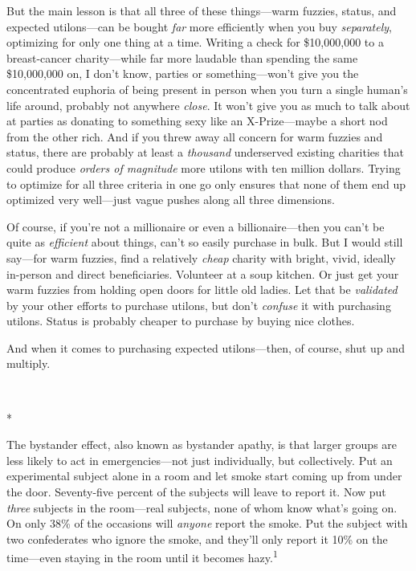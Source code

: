 {
 But the main lesson is that all three of these things---warm
fuzzies, status, and expected utilons---can be bought \textit{far} more
efficiently when you buy \textit{separately}, optimizing for only one
thing at a time. Writing a check for \$10,000,000 to a breast-cancer
charity---while far more laudable than spending the same \$10,000,000
on, I don't know, parties or
something---won't give you the concentrated euphoria of
being present in person when you turn a single human's
life around, probably not anywhere \textit{close}. It
won't give you as much to talk about at parties as
donating to something sexy like an X-Prize---maybe a short nod from the
other rich. And if you threw away all concern for warm fuzzies and
status, there are probably at least a \textit{thousand} underserved
existing charities that could produce \textit{orders of magnitude} more
utilons with ten million dollars. Trying to optimize for all three
criteria in one go only ensures that none of them end up optimized very
well---just vague pushes along all three dimensions.}

{
 Of course, if you're not a millionaire or even a
billionaire---then you can't be quite as
\textit{efficient} about things, can't so easily
purchase in bulk. But I would still say---for warm fuzzies, find a
relatively \textit{cheap} charity with bright, vivid, ideally in-person
and direct beneficiaries. Volunteer at a soup kitchen. Or just get your
warm fuzzies from holding open doors for little old ladies. Let that be
\textit{validated} by your other efforts to purchase utilons, but
don't \textit{confuse} it with purchasing utilons.
Status is probably cheaper to purchase by buying nice clothes.}

{
 And when it comes to purchasing expected utilons---then, of
course, shut up and multiply.}

{\centering
 \ ~
\par}

{\centering
 *
\par}


{
 The bystander effect, also known as bystander apathy, is that
larger groups are less likely to act in emergencies---not just
individually, but collectively. Put an experimental subject alone in a
room and let smoke start coming up from under the door. Seventy-five
percent of the subjects will leave to report it. Now put \textit{three}
subjects in the room---real subjects, none of whom know
what's going on. On only 38\% of the occasions will
\textit{anyone} report the smoke. Put the subject with two confederates
who ignore the smoke, and they'll only report it 10\%
on the time---even staying in the room until it becomes
hazy.\textsuperscript{1} }

